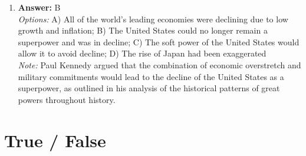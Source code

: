 \documentclass[12pt]{article}
\begin{document}
\begin{enumerate}[label=\arabic*.]
\item \textbf{Answer:} B
\\ \textit{Options:} A) All of the world's leading economies were declining due to low growth and inflation; B) The United States could no longer remain a superpower and was in decline; C) The soft power of the United States would allow it to avoid decline; D) The rise of Japan had been exaggerated
\\ \textit{Note:} Paul Kennedy argued that the combination of economic overstretch and military commitments would lead to the decline of the United States as a superpower, as outlined in his analysis of the historical patterns of great powers throughout history.
\end{enumerate}

\section*{True / False}
\end{document}
